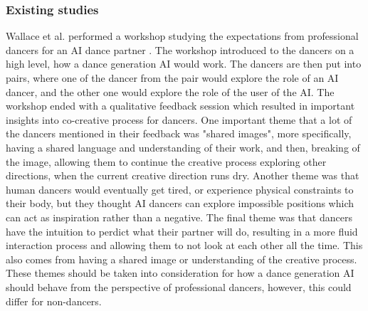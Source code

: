 \documentclass[final,5p,times,twocolumn,authoryear]{article}
\begin{document}
\subsubsection{Existing studies}
Wallace et al. performed a workshop studying the expectations from
professional dancers for an AI dance partner \cite{Wallace2023}. The workshop introduced to
the dancers on a high level, how a dance generation AI would work. The
dancers are then put into pairs, where one of the dancer from the pair
would explore the role of an AI dancer, and the other one would explore
the role of the user of the AI. The workshop ended with a qualitative
feedback session which resulted in important insights into co-creative
process for dancers. One important theme that a lot of the dancers
mentioned in their feedback was "shared images", more specifically,
having a shared language and understanding of their work, and then,
breaking of the image, allowing them to continue the creative process
exploring other directions, when the current creative direction runs
dry. Another theme was that human dancers would eventually get tired, or
experience physical constraints to their body, but they thought AI
dancers can explore impossible positions which can act as inspiration
rather than a negative. The final theme was that dancers have the
intuition to perdict what their partner will do, resulting in a more
fluid interaction process and allowing them to not look at each other
all the time. This also comes from having a shared image or
understanding of the creative process. These themes should be taken into
consideration for how a dance generation AI should behave from the
perspective of professional dancers, however, this could differ for
non-dancers.

\end{document}
